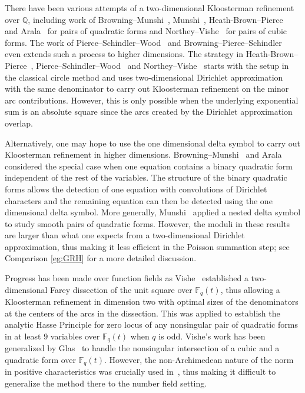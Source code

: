 \documentclass[letterpaper,11pt]{amsart}
\numberwithin{equation}{section}
\theoremstyle{definition}
\numberwithin{equation}{section}
\newcommand{\FF}{\mathbb{F}}
\newcommand{\QQ}{\mathbb{Q}}
\begin{document}
There have been various attempts of a  two-dimensional Kloosterman refinement over $\QQ$, including work of Browning--Munshi~\cite{BM}, Munshi~\cite{M}, Heath-Brown--Pierce~\cite{HBP} and Arala~\cite{Arala} for pairs of quadratic forms and Northey--Vishe~\cite{NV} for pairs of cubic forms.
The work of Pierce--Schindler--Wood~\cite{PSW} and Browning--Pierce--Schindler~\cite{BPS} even extends such a process to higher dimensions. 
The strategy in Heath-Brown--Pierce~\cite{HBP}, Pierce--Schindler--Wood~\cite{PSW} and Northey--Vishe~\cite{NV} starts with the setup in the classical circle method and uses  two-dimensional Dirichlet approximation with the same denominator to carry out Kloosterman refinement on the minor arc contributions. However, this is only possible when the underlying exponential sum is an absolute square since the arcs created by the Dirichlet approximation overlap. 

Alternatively, one may hope to use the one dimensional delta symbol to carry out Kloosterman refinement in higher dimensions. 
Browning--Munshi~\cite{BM} and Arala~\cite{Arala} considered the special case when one equation contains a binary quadratic form independent of the rest of the variables. The structure of the binary quadratic forms allows the detection of one equation with convolutions of Dirichlet characters and the remaining equation can then be detected using the one dimensional delta symbol. More generally, Munshi~\cite{M} applied a nested delta symbol to study smooth pairs of quadratic forms. However, the moduli in these results are larger than what one expects from a  two-dimensional Dirichlet approximation, thus making it less efficient in the Poisson summation step; see Comparison \ref{eg:GRH} for a more detailed discussion. 

Progress has been made over function fields as Vishe~\cite{V19} established a  two-dimensional Farey dissection of the unit square over $\FF_q(t)$, thus allowing a Kloosterman refinement in dimension two with optimal sizes of the denominators at the centers of the arcs in the dissection. This was applied to establish the analytic Hasse Principle for zero locus of any nonsingular pair of quadratic forms in at least $9$ variables over $\mathbb F_q(t)$ when $q$ is odd. Vishe's work has been generalized by Glas~\cite{Glas} to handle the nonsingular intersection of a cubic and a quadratic form over $\mathbb F_q(t)$. However, the non-Archimedean nature of the norm in positive characteristics was crucially used in~\cite{V19}, thus making it difficult to generalize the method there to the number field setting. 
\end{document}

